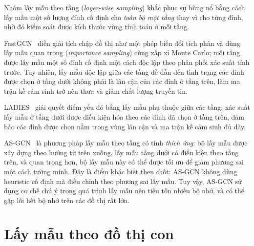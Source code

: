 Nhóm lấy mẫu theo tầng (\textit{layer-wise sampling}) khắc phục sự bùng nổ bằng cách lấy mẫu một số lượng đỉnh cố định cho \textit{toàn bộ một tầng} thay vì cho từng đỉnh, nhờ đó kiểm soát được kích thước vùng tính toán ở mỗi tầng.

FastGCN~\cite{ChenFastGCN2018} diễn giải tích chập đồ thị như một phép biến đổi tích phân và dùng lấy mẫu quan trọng (\textit{importance sampling}) cùng xấp xỉ Monte Carlo; mỗi tầng được lấy mẫu một số đỉnh cố định một cách độc lập theo phân phối xác suất tính trước. Tuy nhiên, lấy mẫu độc lập giữa các tầng dễ dẫn đến tình trạng các đỉnh được chọn ở tầng dưới không phải là lân cận của các đỉnh ở tầng trên, làm ma trận kề cảm sinh trở nên thưa và giảm chất lượng truyền tin.

LADIES~\cite{Zou2019LADIES} giải quyết điểm yếu đó bằng lấy mẫu phụ thuộc giữa các tầng: xác suất lấy mẫu ở tầng dưới được điều kiện hóa theo các đỉnh đã chọn ở tầng trên, đảm bảo các đỉnh được chọn nằm trong vùng lân cận và ma trận kề cảm sinh đủ dày.

AS-GCN~\cite{Huang2018ASGCN} là phương pháp lấy mẫu theo tầng có tính \textit{thích ứng}: bộ lấy mẫu được xây dựng theo hướng từ trên xuống, lấy mẫu tầng dưới có điều kiện theo tầng trên, và quan trọng hơn, bộ lấy mẫu này có thể được tối ưu để giảm phương sai một cách tường minh. Đây là điểm khác biệt then chốt: AS-GCN không dùng heuristic cố định mà điều chỉnh theo phương sai lấy mẫu. Tuy vậy, AS-GCN sử dụng cơ chế chú ý trong quá trình lấy mẫu nên tiêu tốn nhiều bộ nhớ, và có thể gặp lỗi hết bộ nhớ trên các đồ thị rất lớn.

\section{Lấy mẫu theo đồ thị con}

